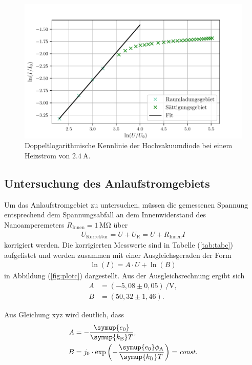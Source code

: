 \begin{figure}[H]
  \centering
  \includegraphics{plotb.pdf}
  \caption{Doppeltlogarithmische Kennlinie der Hochvakuumdiode bei einem Heizstrom von $\SI{2.4}{\ampere}$.}
  \label{fig:plotb}
\end{figure}

\subsection{Untersuchung des Anlaufstromgebiets}
Um das Anlaufstromgebiet zu untersuchen, müssen die gemessenen Spannung entsprechend
dem Spannungsabfall an dem Innenwiderstand des Nanoamperemeters $R_\text{Innen} = 1\,\si{\mega\ohm}$
über
\begin{align*}
U_\text{Korrektur} = U + U_\text{R} = U + R_\text{Innen} I
\end{align*}
korrigiert werden. Die korrigierten Messwerte sind in Tabelle (\ref{tab:tabc}) aufgelistet und werden
zusammen mit einer Ausgleichsgeraden der Form
\begin{align*}
\ln(I) = A\cdot U + \ln(B)
\end{align*} 
in Abbildung (\ref{fig:plotc}) dargestellt. Aus der Ausgleichsrechnung ergibt sich
\begin{align*}
A &= (-5,08 \pm 0,05)\,\si{\per\volt},\\
B &= (50,32 \pm 1,46).
\end{align*}

Aus Gleichung xyz wird deutlich, dass
\begin{align*}
  A &= -\frac{\symup{e_\text{0}}}{\symup{k_\text{B}} T}, \\
  B &= j_0 \cdot \exp\left(-\frac{\symup{e_\text{0}} \phi_\text{A}}{\symup{k_\text{B}} T}\right) = \mathit{const}.
\end{align*}

